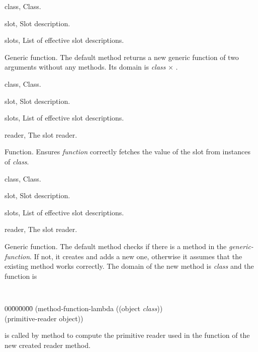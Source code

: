 \begin{optDefinition}
%
\begin{specargs}
    \item[class, \classref{class}] Class.
    \item[slot, \classref{slot}] Slot description.
    \item[slots, \classref{list}] List of effective slot
    descriptions.
\end{specargs}
%
\result%
Generic function.
%
\remarks%
The default method returns a new generic function of two arguments
without any methods. Its domain is {\em class} $\times$ .

%
\begin{genericargs}
    \item[class, \classref{class}] Class.
    \item[slot, \classref{slot}] Slot description.
    \item[slots, \classref{list}] List of effective slot
    descriptions.
    \item[reader, \classref{function}] The slot reader.
\end{genericargs}
%
\result%
Function.
%
\remarks%
Ensures {\em function} correctly fetches the value of the slot from
instances of {\em class}.

%
\begin{specargs}
    \item[class, \classref{class}] Class.
    \item[slot, \classref{slot}] Slot description.
    \item[slots, \classref{list}] List of effective slot descriptions.
    \item[reader, \classref{generic-function}] The slot reader.
\end{specargs}
%
\result%
Generic function.
%
\remarks%
The default method checks if there is a method in the {\em
generic-function}. If not, it creates and adds a new one, otherwise it
assumes that the existing method works correctly. The domain
of the new method is {\em class} and the function is
{\tt
\begin{tabbing}
    00\=00\=00\=00\= \kill
    (method-function-lambda ((object {\em class}))\\
    \>(primitive-reader object))
\end{tabbing}
}
 is called by
 method to compute the primitive reader used
in the function of the new created reader method.


\end{optDefinition}
